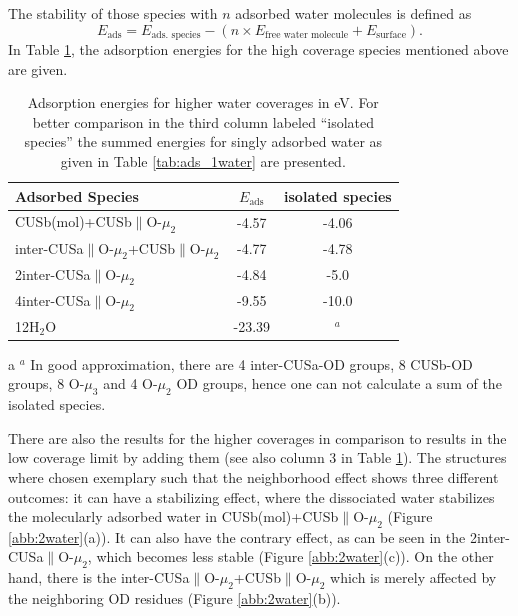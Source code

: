 \documentclass[11pt,DIV=13,BCOR=5mm,a4paper,headinclude]{scrbook}
\begin{document}
The stability of those species with $n$ adsorbed water molecules is defined as
\begin{equation}
 E_\textrm{ads}=E_\text{ads.
species}-(n\times E_\text{free water molecule}+E_\text{surface}).
\end{equation}
In Table \ref{tab:higher_water}, the adsorption energies for the high coverage species mentioned above are given.
\begin{table}[!ht]
  \centering
 \caption{Adsorption energies for higher water coverages in eV.
For better comparison in the third column labeled ``isolated species'' the summed energies for singly adsorbed water as given in Table \ref{tab:ads_1water} are presented.
\vspace*{.2cm} 
  }
  \begin{tabular}{lcc}
  \toprule
  Adsorbed Species  & $E_\text{ads}$ &isolated species \\\midrule
   CUSb(mol)+CUSb$\parallel$O-$\mu_2$ & -4.57 & -4.06\\
   inter-CUSa$\parallel$O-$\mu_2$+CUSb$\parallel$O-$\mu_2$ & -4.77 & -4.78\\
   2inter-CUSa$\parallel$O-$\mu_2$& -4.84 &-5.0 \\\hline
   4inter-CUSa$\parallel$O-$\mu_2$ & -9.55 & -10.0\\\hline
   12H$_2$O & -23.39& $^a$\tnote{a} \\   \bottomrule
  \end{tabular}
  \label{tab:higher_water}
  \begin{tablenotes}\footnotesize 
    \item[a] $^a$ In good approximation, there are 4 inter-CUSa-OD groups, 8 CUSb-OD groups, 8 O-$\mu_3$ and 4 O-$\mu_2$ OD groups, hence one can not calculate a sum of the isolated species.
  \end{tablenotes}
\end{table}
There are also the results for the higher coverages in comparison to results in the low coverage limit by adding them (see also column 3 in Table \ref{tab:higher_water}).
The structures where chosen exemplary such that the neighborhood effect shows three different outcomes: it can have a stabilizing effect, where the dissociated water stabilizes the molecularly adsorbed water in CUSb(mol)+CUSb$\parallel$O-$\mu_2$ (Figure \ref{abb:2water}(a)).
It can also have the contrary effect, as can be seen in the  2inter-CUSa$\parallel$O-$\mu_2$, which becomes less stable (Figure \ref{abb:2water}(c)).
On the other hand, there is the inter-CUSa$\parallel$O-$\mu_2$+CUSb$\parallel$O-$\mu_2$ which is merely affected by the neighboring OD residues (Figure \ref{abb:2water}(b)).
\\
\\
\end{document}
